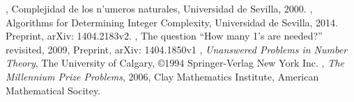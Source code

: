 \documentclass[a4paper,titlepage]{article}
\theoremstyle{definition}
\begin{document}
\newpage
\begin{thebibliography}{9}

        , Complejidad de los n'umeros naturales,
        Universidad de Sevilla, 2000. 
     	, Algorithms for Determining
        Integer Complexity, Universidad de Sevilla, 2014. Preprint, arXiv: 1404.2183v2.
     	, The question ``How many 1’s
        are needed?'' revisited, 2009, Preprint, arXiv: 1404.1850v1
     	, \emph{Unanswered Problems in Number Theory}, The University of Calgary, 
        \copyright 1994 Springer-Verlag New York Inc. 
     	, \emph{The Millennium Prize Problems}, 2006, Clay Mathematics Institute, American Mathematical Socitey.

\end{thebibliography}
%
\end{document}
